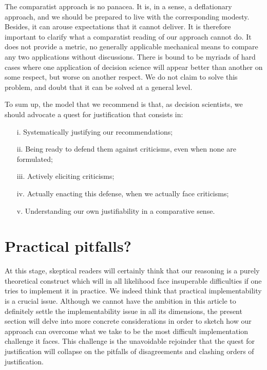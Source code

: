 \documentclass[preprint, french, english, 11pt, authoryear]{elsarticle}%
\begin{document}
The comparatist approach is no panacea. It is, in a sense, a deflationary approach, and we should be prepared to live with the corresponding modesty. 
Besides, it can arouse expectations that it cannot deliver. It is therefore important to clarify what a comparatist reading of our approach cannot do. It does not provide a metric, no generally applicable mechanical means to compare any two applications without discussions. There is bound to be myriads of hard cases where one application of decision science will appear better than another on some respect, but worse on another respect. We do not claim to solve this problem, and doubt that it can be solved at a general level.

To sum up, the model that we recommend is that, as decision scientists, we should advocate a quest for justification that consists in:
\begin{itemize}
\item[i.]	Systematically justifying our recommendations;
\item[ii.]	Being ready to defend them against criticisms, even when none are formulated;
\item[iii.]	Actively eliciting criticisms;
\item[iv.]	Actually enacting this defense, when we actually face criticisms;
\item[v.]	Understanding our own justifiability in a comparative sense.
\end{itemize}

\section{Practical pitfalls?}
At this stage, skeptical readers will certainly think that our reasoning is a purely theoretical construct which will in all likelihood face insuperable difficulties if one tries to implement it in practice. We indeed think that practical implementability is a crucial issue. Although we cannot have the ambition in this article to definitely settle the implementability issue in all its dimensions, the present section will delve into more concrete considerations in order to sketch how our approach can overcome what we take to be the most difficult implementation challenge it faces. This challenge is the unavoidable rejoinder that the quest for justification will collapse on the pitfalls of disagreements and clashing orders of justification.
\end{document}
